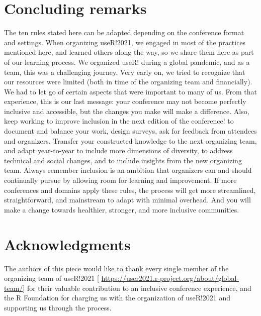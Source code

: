 \documentclass[10pt,letterpaper]{article}
\begin{document}
\section*{Concluding remarks}

The ten rules stated here can be adapted depending on the conference format and settings.
When organizing useR!2021, we engaged in most of the practices mentioned here, and learned others along the way, so we share them here as part of our learning process. 
We organized useR! during a global pandemic, and as a team, this was a challenging journey. 
Very early on, we tried to recognize that our resources were limited (both in time of the organizing team and financially). 
We had to let go of certain aspects that were important to many of us. 
From that experience, this is our last message: your conference may not become perfectly inclusive and accessible, but the changes you make will make a difference.
Also, keep working to improve inclusion in the next edition of the conference! to document and balance your work, design surveys, ask for feedback from attendees and organizers. Transfer your constructed knowledge to the next organizing team, and adapt year-to-year to include more dimensions of diversity, to address technical and social changes, and to include insights from the new organizing team. Always remember inclusion is an ambition that organizers can and should continually pursue by allowing room for learning and improvement.
If more conferences and domains apply these rules, the process will get more streamlined, straightforward, and mainstream to adapt with minimal overhead.
And you will make a change towards healthier, stronger, and more inclusive communities.




\section*{Acknowledgments}
The authors of this piece would like to thank every single member of the organizing team of useR!2021 [ \url{https://user2021.r-project.org/about/global-team/}] for their valuable contribution to an inclusive conference experience, and the R Foundation for charging us with the organization of useR!2021 and supporting us through the process. 




\end{document}

